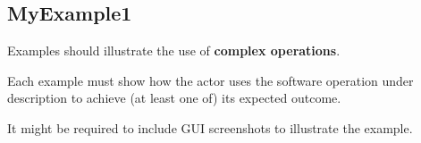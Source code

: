  
\subsection{MyExample1}
Examples should illustrate the use of \textbf{complex operations}.

Each example must show how the actor uses the software operation under
description to achieve (at least one of) its expected outcome.

It might be required to include GUI screenshots to illustrate the example.



